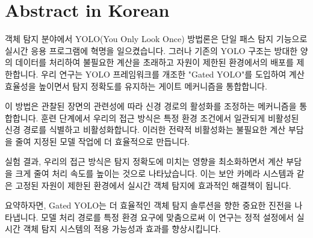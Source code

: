 \section*{Abstract in Korean} 						%

객체 탐지 분야에서 YOLO(You Only Look Once) 방법론은 단일 패스 탐지 기능으로 실시간 응용 프로그램에 혁명을 일으켰습니다. 그러나 기존의 YOLO 구조는 방대한 양의 데이터를 처리하여 불필요한 계산을 초래하고 자원이 제한된 환경에서의 배포를 제한합니다. 우리 연구는 YOLO 프레임워크를 개조한 "Gated YOLO"를 도입하여 계산 효율성을 높이면서 탐지 정확도를 유지하는 게이트 메커니즘을 통합합니다.

이 방법은 관찰된 장면의 관련성에 따라 신경 경로의 활성화를 조정하는 메커니즘을 통합합니다. 훈련 단계에서 우리의 접근 방식은 특정 환경 조건에서 일관되게 비활성된 신경 경로를 식별하고 비활성화합니다. 이러한 전략적 비활성화는 불필요한 계산 부담을 줄여 지정된 모델 작업에 더 효율적으로 만듭니다.

실험 결과, 우리의 접근 방식은 탐지 정확도에 미치는 영향을 최소화하면서 계산 부담을 크게 줄여 처리 속도를 높이는 것으로 나타났습니다. 이는 보안 카메라 시스템과 같은 고정된 자원이 제한된 환경에서 실시간 객체 탐지에 효과적인 해결책이 됩니다.

요약하자면, Gated YOLO는 더 효율적인 객체 탐지 솔루션을 향한 중요한 진전을 나타냅니다. 모델 처리 경로를 특정 환경 요구에 맞춤으로써 이 연구는 정적 설정에서 실시간 객체 탐지 시스템의 적용 가능성과 효과를 향상시킵니다.

\clearpage